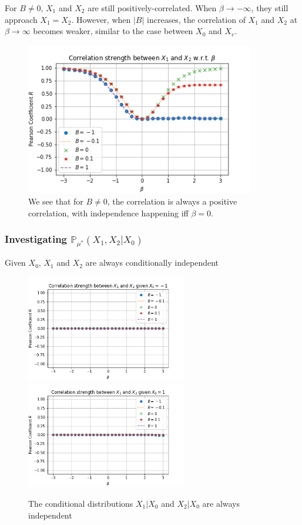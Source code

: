 \documentclass[12pt]{article}
\begin{document}
For $B\neq 0$, $X_1$ and $X_2$ are still positively-correlated. When $\beta\rightarrow-\infty$, they still approach $X_1=X_2$. However, when
$|B|$ increases, the correlation of $X_1$ and $X_2$ at $\beta\rightarrow\infty$
becomes weaker, similar to the case between $X_0$ and $X_v$.
\begin{figure}[h]
    \centering
    \includegraphics[width=10cm]{img/ising_x1_x2_pearson.png}
    \caption{We see that for $B\neq 0$, the correlation is always a positive correlation, with independence happening iff $\beta=0$.}
    \label{Fig.ising-x1-x2-B}
\end{figure}

\subsubsection{Investigating $\mathbb{P}_{\mu^*}(X_1, X_2|X_0)$}

Given $X_0$, $X_1$ and $X_2$ are always conditionally independent

\begin{figure}[h]
    \centering
    \includegraphics[width=7cm]{img/ising_x1_x2_pearson_x0=-1.png}
    \quad
    \includegraphics[width=7cm]{img/ising_x1_x2_pearson_x0=1.png}
    \caption{The conditional distributions $X_1|X_0$ and $X_2|X_0$ are always independent}
    \label{Fig.ising-x1-x2-given-x0-B}
\end{figure}
\end{document}

